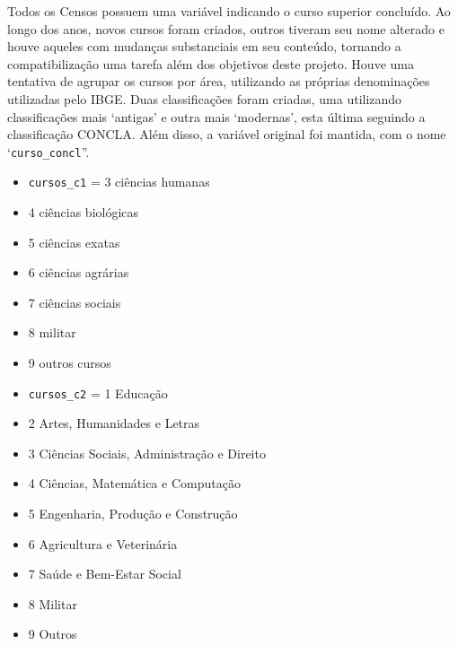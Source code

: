 \documentclass[12pt,a4paper]{article}
\newcommand{\vr}[1]{\texttt{#1}}
\begin{document}
Todos os Censos possuem uma variável indicando o curso superior concluído. Ao longo dos anos, novos cursos foram criados, outros tiveram seu nome alterado e houve aqueles com mudanças substanciais em seu conteúdo, tornando a compatibilização uma tarefa além dos objetivos deste projeto. Houve uma tentativa de agrupar os cursos por área, utilizando as próprias denominações utilizadas pelo IBGE. Duas classificações foram criadas, uma utilizando classificações mais ‘antigas’ e outra mais ‘modernas’, esta última seguindo a classificação CONCLA. Além disso, a variável original foi mantida, com o nome ‘\vr{curso\_concl}”.
\begin{itemize}
  \item \vr{cursos\_c1} = 3 ciências humanas
  \item 4 ciências biológicas
  \item 5 ciências exatas
  \item 6 ciências agrárias
  \item 7 ciências sociais
  \item 8 militar
  \item 9 outros cursos
  \item \vr{cursos\_c2} = 1 Educação
  \item 2 Artes, Humanidades e Letras
  \item 3 Ciências Sociais, Administração e Direito
  \item 4 Ciências, Matemática e Computação
  \item 5 Engenharia, Produção e Construção
  \item 6 Agricultura e Veterinária
  \item 7 Saúde e Bem-Estar Social
  \item 8 Militar
  \item 9 Outros
\end{itemize}
\end{document}
